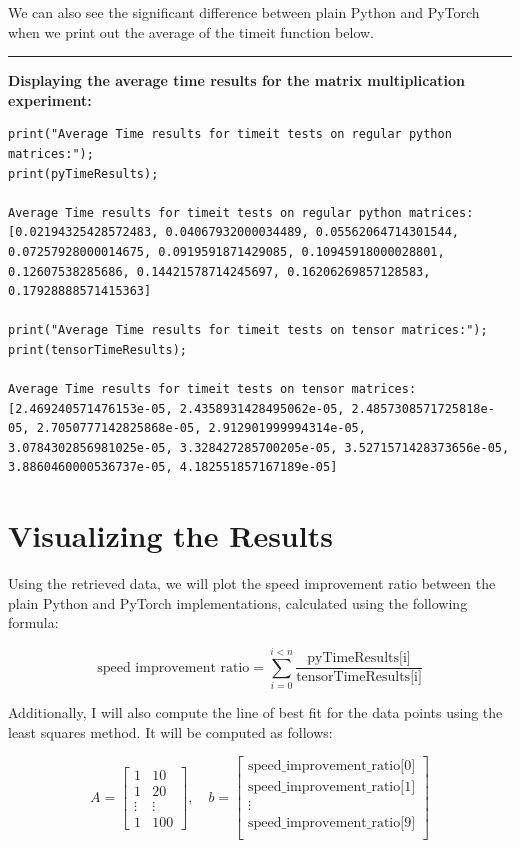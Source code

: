 \documentclass[12pt]{article}
\begin{document}
\noindent We can also see the significant difference between plain Python and PyTorch when we
print out the average of the timeit function below.

\noindent\rule{\textwidth}{0.4pt}
\noindent\textbf{Displaying the average time results for the matrix multiplication experiment:}
\begin{lstlisting}
print("Average Time results for timeit tests on regular python matrices:");
print(pyTimeResults);

Average Time results for timeit tests on regular python matrices:
[0.02194325428572483, 0.04067932000034489, 0.05562064714301544, 0.07257928000014675, 0.0919591871429085, 0.10945918000028801, 0.12607538285686, 0.14421578714245697, 0.16206269857128583, 0.17928888571415363]

print("Average Time results for timeit tests on tensor matrices:");
print(tensorTimeResults);

Average Time results for timeit tests on tensor matrices:
[2.469240571476153e-05, 2.4358931428495062e-05, 2.4857308571725818e-05, 2.7050777142825868e-05, 2.912901999994314e-05, 3.0784302856981025e-05, 3.328427285700205e-05, 3.5271571428373656e-05, 3.8860460000536737e-05, 4.182551857167189e-05]
\end{lstlisting}

\section{Visualizing the Results}
Using the retrieved data, we will plot the speed improvement ratio between the plain Python and PyTorch implementations, calculated using the following formula:

\begin{equation*}
    \text{speed improvement ratio} = \sum_{i = 0}^{i < n} \frac{\text{pyTimeResults[i]}}{\text{tensorTimeResults[i]}}
\end{equation*}

\noindent Additionally, I will also compute the line of best fit for the data points using the least squares method.
It will be computed as follows:

\begin{equation*}
    A = 
    \begin{bmatrix}
        1 & 10 \\
        1 & 20 \\
        \vdots & \vdots \\
        1 & 100
    \end{bmatrix},\quad
    b =
    \begin{bmatrix}
        \text{speed\_improvement\_ratio[0]} \\
        \text{speed\_improvement\_ratio[1]} \\
        \vdots \\
        \text{speed\_improvement\_ratio[9]} \\
    \end{bmatrix}
\end{equation*}
\end{document}
